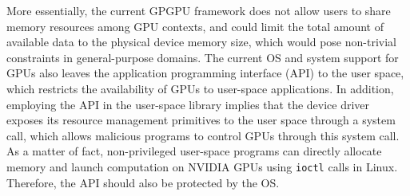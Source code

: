 More essentially, the current GPGPU framework does not allow
users to share memory resources among GPU contexts, and could limit the
total amount of available data to the physical device memory size, which would pose non-trivial constraints in
general-purpose domains.
The current OS and system support for GPUs also leaves the
application programming interface (API) to the user space, which
restricts the availability of GPUs to user-space applications.
In addition, employing the API in the user-space library implies that
the device driver exposes its resource management primitives to the user
space through a system call, which allows malicious programs to control
GPUs through this system call. 
As a matter of fact, non-privileged user-space programs can directly
allocate memory and launch computation on NVIDIA GPUs using
\texttt{ioctl} calls in Linux.
Therefore, the API should also be protected by the OS.

